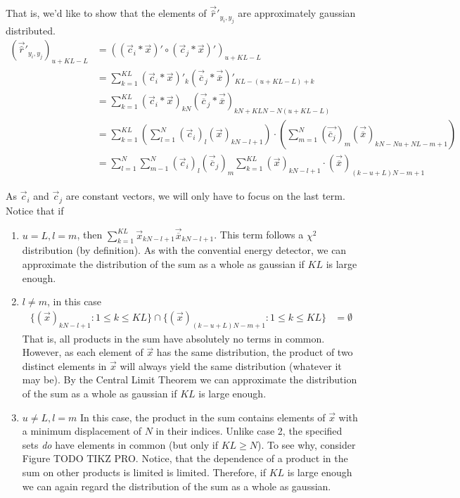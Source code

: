 \documentclass[a4paper, openany, oneside]{memoir}
\begin{document}
That is, we'd like to show that the elements of $\vec{\hat{r}}'_{y_i,y_j}$ are approximately gaussian distributed.
\begin{align*}
(\vec{\hat{r}}'_{y_i,y_j})_{u+KL-L} &= \left(\left(\vec{c}_i\ast\vec{x}\right)' \circ \left(\vec{c}_j\ast\vec{x}\right)' \right)_{u+KL-L} \\
&= \sum_{k=1}^{KL} \left(\vec{c}_i\ast\vec{x}\right)'_k \left(\vec{\overline{c}}_j\ast\vec{\overline{x}}\right)'_{KL-(u+KL-L)+k} \\
&= \sum_{k=1}^{KL} \left(\vec{c}_i\ast\vec{x}\right)_{kN} \left(\vec{\overline{c}}_j\ast\vec{\overline{x}}\right)_{kN+KLN-N(u+KL-L)}\\
&=  \sum_{k=1}^{KL} \left(\sum_{l=1}^N \left(\vec{c}_i\right)_l\left(\vec{x}\right)_{kN-l+1}\right) \cdot \left(\sum_{m=1}^{N} \left(\vec{\overline{c}_j}\right)_m\left(\vec{\overline{x}}\right)_{kN - Nu + NL - m+1}\right)\\
&= \sum_{l=1}^N\sum_{m-1}^N \left(\vec{c}_i\right)_l \left(\vec{\overline{c}}_j\right)_m \sum_{k=1}^{KL} (\vec{x})_{kN-l+1} \cdot (\vec{\overline{x}})_{(k-u+L)N - m+1}
\end{align*}

As $\vec{c}_i$ and $\vec{c}_j$ are constant vectors, we will only have to focus on the last term. Notice that if

\begin{enumerate}
	\item $u=L, l=m$, then $\sum_{k=1}^{KL}\vec{x}_{kN-l+1}\vec{\overline{x}}_{kN-l+1}$. This term follows a $\chi^2$ distribution (by definition). As with the convential energy detector, we can approximate the distribution of the sum as a whole as gaussian if $KL$ is large enough.
	\item $l \neq m$, in this case 
	\begin{align*}\{(\vec{x})_{kN-l+1} : 1 \leq k \leq KL\} \cap 
	\{(\vec{x})_{(k-u+L)N - m+1} : 1 \leq k \leq KL\}  &= \emptyset
	\end{align*}
	That is, all products in the sum have absolutely no terms in common. However, as each element of $\vec{x}$ has the same distribution, the product of two distinct elements in $\vec{x}$ will always yield the same distribution (whatever it may be). By the Central Limit Theorem we can approximate the distribution of the sum as a whole as gaussian if $KL$ is large enough.
	\item $u\neq L, l=m$ In this case, the product in the sum contains elements of $\vec{x}$ with a minimum displacement of $N$ in their indices. Unlike case 2, the specified sets \emph{do} have elements in common (but only if $KL \geq N$). To see why, consider Figure TODO TIKZ PRO. Notice, that the dependence of a product in the sum on other products is limited is limited. Therefore, if $KL$ is large enough we can again regard the distribution of the sum as a whole as gaussian.			
\end{enumerate}
\end{document}
